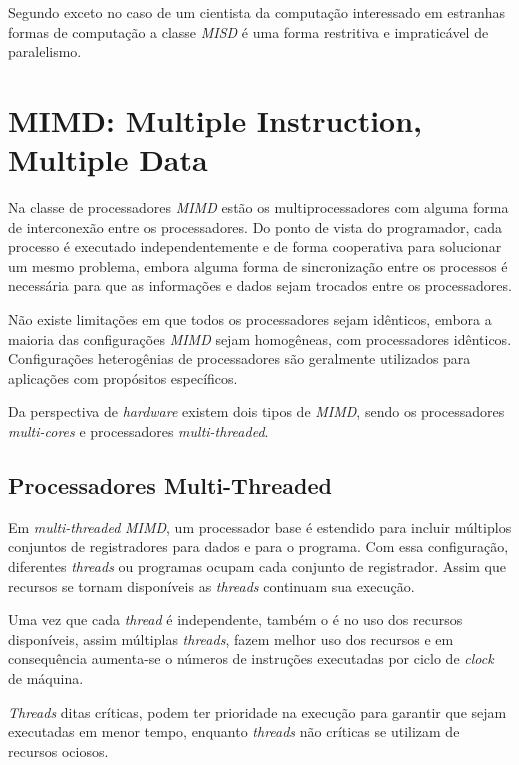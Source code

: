 Segundo \cite{Openshaw:1999} exceto no caso de um cientista da computação
interessado em estranhas formas de computação a classe \textit{MISD} é uma forma
restritiva e impraticável de paralelismo.

\section{MIMD: Multiple Instruction, Multiple Data}

Na classe de processadores \textit{MIMD} estão os multiprocessadores
com alguma forma de interconexão entre os processadores. Do ponto de vista do
programador, cada processo é executado independentemente e de forma cooperativa
para solucionar um mesmo problema, embora alguma forma de sincronização entre os
processos é necessária para que as informações e dados sejam trocados entre os
processadores.

Não existe limitações em que todos os processadores sejam idênticos, embora a
maioria das configurações \textit{MIMD} sejam homogêneas, com processadores
idênticos. Configurações heterogênias de processadores são geralmente utilizados
para aplicações com propósitos específicos.

Da perspectiva de \textit{hardware} existem dois tipos de \textit{MIMD}, sendo os
processadores \textit{multi-cores} e processadores \textit{multi-threaded}.


\subsection{Processadores Multi-Threaded}

Em \textit{multi-threaded} \textit{MIMD}, um processador base é
estendido para incluir múltiplos conjuntos de registradores para dados e para o
programa.
Com essa configuração, diferentes \textit{threads} ou programas ocupam cada
conjunto de registrador. Assim que recursos se tornam disponíveis as
\textit{threads} continuam sua execução.

Uma vez que cada \textit{thread} é independente, também o é no uso dos recursos
disponíveis, assim múltiplas \textit{threads}, fazem melhor uso dos recursos e
em consequência aumenta-se o números de instruções executadas por ciclo de
\textit{clock} de máquina.

\textit{Threads} ditas críticas, podem ter prioridade na execução para garantir
que sejam executadas em menor tempo, enquanto \textit{threads} não críticas se
utilizam de recursos ociosos.


